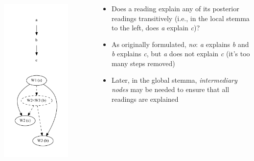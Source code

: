 \documentclass[10pt]{beamer}
\begin{document}
	\begin{frame}
		\begin{columns}
			\begin{column}{0.4\textwidth}
				\centering
				\includegraphics[width=0.75\textwidth]{../img/intermediary-node-example.pdf}
			\end{column}
			\begin{column}{0.55\textwidth}
				\begin{itemize}
					\item Does a reading explain any of its posterior readings transitively (i.e., in the local stemma to the left, does \emph{a} explain \emph{c})?
					\item As originally formulated, \emph{no}: \emph{a} explains \emph{b} and \emph{b} explains \emph{c}, but \emph{a} does not explain \emph{c} (it's too many steps removed)
					\item Later, in the global stemma, \emph{intermediary nodes} may be needed to ensure that all readings are explained
				\end{itemize}
			\end{column}
		\end{columns}
	\end{frame}
\end{document}

